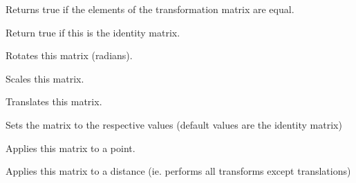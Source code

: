 
Returns true if the elements of the transformation matrix are equal.

\label{wxgraphicsmatrixisidentity}


Return true if this is the identity matrix.

\label{wxgraphicsmatrixrotate}


Rotates this matrix (radians).

\label{wxgraphicsmatrixscale}


Scales this matrix.

\label{wxgraphicsmatrixtranslate}


Translates this matrix.

\label{wxgraphicsmatrixset}


Sets the matrix to the respective values (default values are the identity matrix)

\label{wxgraphicsmatrixtransformpoint}


Applies this matrix to a point.

\label{wxgraphicsmatrixtransformdistance}


Applies this matrix to a distance (ie. performs all transforms except translations)



